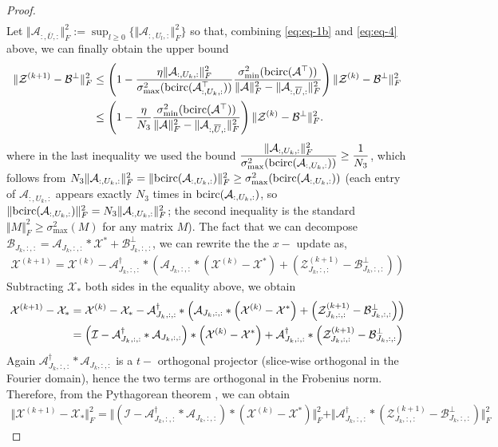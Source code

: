 \documentclass[11pt]{article}
\def\fm#1{\mathcal{#1}}
\def \a#1{\fm A_{:, #1, :}}
\def \b#1{\fm B_{#1, :, :}}
\def \ai#1{\fm A_{#1, :, :}}
\def \z#1#2{\fm Z^{(#1)}_{#2, :, :}}
\def \bp#1{\fm B^{\perp}_{#1, :, :}}
\def \x#1{\fm X^{(#1)}}
\begin{document}
\begin{proof}
\begin{align}
\end{align}
Let $\Vert \a{\overline{U}} \Vert_F^2 := \sup_{l\geq 0} \{ \Vert \a{U_l}\Vert_F^2\}$ so that, combining \eqref{eq:eq-1b} and  \eqref{eq:eq-4} above, we can finally obtain the upper bound
\begin{align}
     \Vert   \fm Z^{(k+1)} - \fm B^\perp  \Vert_F^2  & \leq  \left( 1 - \frac{\eta \Vert \a{U_k} \Vert_F^2}{ \sigma_{\max}^2(\bcirc(\a{U_k}^\top)) } \frac{\sigma_{\min}^2(\bcirc(\fm A^\top))}{\Vert \fm A \Vert_F^2 - \Vert \a{\overline{U}} \Vert_F^2}   \right) \Vert  \fm Z^{(k)} - \fm B^\perp \Vert_F^2  \notag \\
     & \leq \left( 1 - \frac{\eta}{N_3}  \frac{\sigma_{\min}^2(\bcirc(\fm A^\top))}{\Vert \fm A \Vert_F^2 - \Vert \a{\overline{U}} \Vert_F^2}   \right) \Vert  \fm Z^{(k)} - \fm B^\perp \Vert_F^2 .
\end{align}
where in the last inequality we used the bound
$\dfrac{\Vert \a{U_k}\Vert_F^2}{\sigma_{\max}^2(\bcirc(\a{U_k}))} \geq \dfrac{1}{N_3}$,
which follows from $N_3\Vert \a{U_k}\Vert_F^2 = \Vert\bcirc(\a{U_k})\Vert_F^2 \geq \sigma_{\max}^2(\bcirc(\a{U_k}))$
(each entry of $\a{U_k}$ appears exactly $N_3$ times in $\bcirc(\a{U_k})$, so
$\Vert\bcirc(\a{U_k})\Vert_F^2 = N_3\Vert \a{U_k}\Vert_F^2$; the second inequality is
the standard $\Vert M\Vert_F^2\geq\sigma_{\max}^2(M)$ for any matrix $M$). The fact that  we can decompose $\b{J_k} = \ai{J_k}*\fm X^\ast + \bp{J_k} $, we can rewrite the the $x-$ update as,
\begin{align*}
   \fm X^{(k+1)} = \x k - \ai{J_k}^\dagger * \left( \ai{J_k} *\left(\x k - \fm X^\ast \right) + \left(\z{k+1}{J_k} - \bp{J_k}  \right)\right)
\end{align*}
Subtracting $\fm X_\ast$  both sides  in the equality above, we obtain
\begin{align}
   \x {k+1} - \fm X_\ast  & =  \x{k} - \fm X_\ast  - \ai{J_k}^\dagger * \left( \ai{J_k} *\left(\x k - \fm X^\ast \right) + \left(\z{k+1}{J_k} - \bp{J_k}  \right)\right) \notag\\
   & =  \left( \fm I - \ai{J_k}^\dagger *  \ai{J_k} \right) *\left(\x k - \fm X^\ast   \right) +  \ai{J_k}^\dagger* \left(\z{k+1}{J_k} - \bp{J_k}  \right)
\end{align}
Again $\ai{J_k}^\dagger * \ai{J_k}$ is a $t-$ orthogonal projector  (slice-wise  orthogonal in the Fourier  domain), hence the two terms are orthogonal in the Frobenius norm. Therefore,  from the  Pythagorean theorem , we can obtain
\begin{align}
    \Vert \x{k+1} - \fm X_\ast \Vert_F^2 = \Vert \left( \fm I - \ai{J_k}^\dagger *  \ai{J_k} \right) *\left(\x k - \fm X^\ast   \right) \Vert_F^2  +  \Vert  \ai{J_k}^\dagger* \left(\z{k+1}{J_k} - \bp{J_k}  \right) \Vert_F^2  \label{eq:eq-5}

\end{align}
\end{proof}
\end{document}

